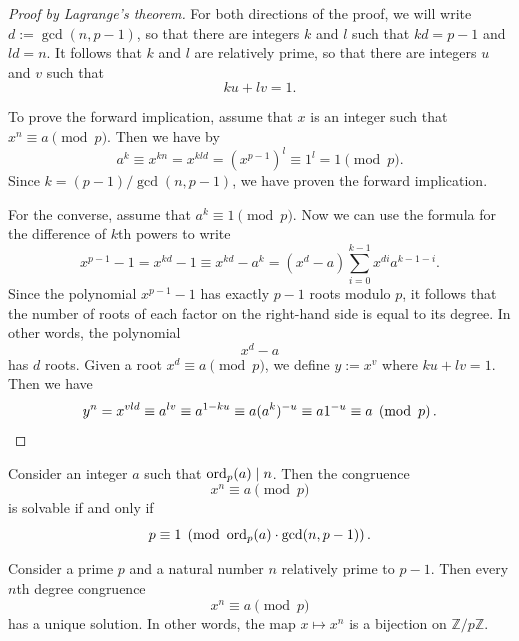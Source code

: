 \begin{proof}[Proof by Lagrange's theorem]
  For both directions of the proof, we will write $d:=\gcd(n,p-1)$, so that there are integers $k$ and $l$ such that $kd=p-1$ and $ld=n$. It follows that $k$ and $l$ are relatively prime, so that there are integers $u$ and $v$ such that
  \begin{equation*}
    ku+lv=1.
  \end{equation*}
  
  To prove the forward implication, assume that $x$ is an integer such that $x^n\equiv a\pmod{p}$. Then we have by 
  \begin{equation*}
    a^k\equiv x^{kn}=x^{kld}=(x^{p-1})^l\equiv 1^l = 1\pmod{p}.
  \end{equation*}
  Since $k=(p-1)/\gcd(n,p-1)$, we have proven the forward implication.

  For the converse, assume that $a^k\equiv 1\pmod{p}$. Now we can use the formula for the difference of $k$th powers to write
  \begin{equation*}
    x^{p-1}-1=x^{kd}-1\equiv x^{kd}-a^k= (x^{d}-a)\sum_{i=0}^{k-1} x^{di}a^{k-1-i}.
  \end{equation*}
  Since the polynomial $x^{p-1}-1$ has exactly $p-1$ roots modulo $p$, it follows that the number of roots of each factor on the right-hand side is equal to its degree. In other words, the polynomial
  \begin{equation*}
    x^{d}-a
  \end{equation*}
  has $d$ roots. Given a root $x^d\equiv a\pmod{p}$, we define $y:=x^v$ where $ku+lv=1$. Then we have
  \begin{equation*}
    y^n=x^{vld}\equiv a^{lv} \equiv a^{1-ku} \equiv a(a^k)^{-u}\equiv a1^{-u}\equiv a\pmod{p}.\qedhere
  \end{equation*}
\end{proof}

\begin{corollary}
  Consider an integer $a$ such that $\ord_p(a)\mid n$. Then the congruence
  \begin{equation*}
    x^n\equiv a\pmod{p}
  \end{equation*}
  is solvable if and only if
  \begin{equation*}
    p\equiv 1\pmod{\ord_p(a)\cdot \gcd(n,p-1)}.
  \end{equation*}
\end{corollary}

\begin{corollary}
  Consider a prime $p$ and a natural number $n$ relatively prime to $p-1$. Then every $n$th degree congruence
  \begin{equation*}
    x^n\equiv a\pmod{p}
  \end{equation*}
  has a unique solution. In other words, the map $x\mapsto x^n$ is a bijection on $\mathbb{Z}/p\mathbb{Z}$.
\end{corollary}

